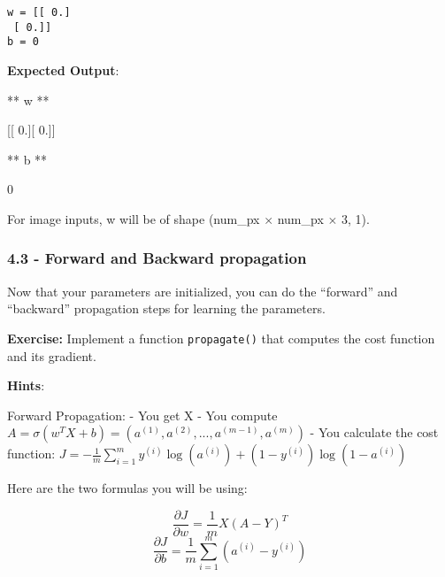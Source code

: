 \documentclass[11pt]{article}
\begin{document}
    \begin{Verbatim}[commandchars=\\\{\}]
w = [[ 0.]
 [ 0.]]
b = 0

    \end{Verbatim}

    \textbf{Expected Output}:

** w **

{[}{[} 0.{]}{[} 0.{]}{]}

** b **

0

For image inputs, w will be of shape (num\_px $\times$ num\_px $\times$
3, 1).

    \subsubsection{4.3 - Forward and Backward
propagation}\label{forward-and-backward-propagation}

Now that your parameters are initialized, you can do the ``forward'' and
``backward'' propagation steps for learning the parameters.

\textbf{Exercise:} Implement a function \texttt{propagate()} that
computes the cost function and its gradient.

\textbf{Hints}:

Forward Propagation: - You get X - You compute
$A = \sigma(w^T X + b) = (a^{(1)}, a^{(2)}, ..., a^{(m-1)}, a^{(m)})$ -
You calculate the cost function:
$J = -\frac{1}{m}\sum_{i=1}^{m}y^{(i)}\log(a^{(i)})+(1-y^{(i)})\log(1-a^{(i)})$

Here are the two formulas you will be using:

\[ \frac{\partial J}{\partial w} = \frac{1}{m}X(A-Y)^T\tag{7}\]
\[ \frac{\partial J}{\partial b} = \frac{1}{m} \sum_{i=1}^m (a^{(i)}-y^{(i)})\tag{8}\]
\end{document}
